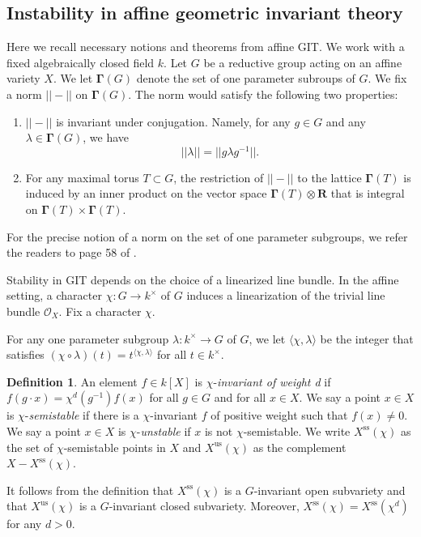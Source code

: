 \documentclass[a4paper]{amsart}
\numberwithin{equation}{section}
\theoremstyle{plain}
\theoremstyle{definition}
\newtheorem{definition}[theorem]{Definition}
\begin{document}
\subsection{Instability in affine geometric invariant theory}\label{affine_GIT}
Here we recall necessary notions and theorems from affine GIT. We work with a fixed algebraically closed field $k$. Let $G$ be a reductive group acting on an affine variety $X$. We let $\pmb{\Gamma}(G)$ denote the set of one parameter subroups of $G$. We fix a norm $||-||$ on $\pmb{\Gamma}(G)$. The norm would satisfy the following two properties:
\begin{enumerate}
    \item $||-||$ is invariant under conjugation. Namely, for any $g\in G$ and any $\lambda\in\pmb{\Gamma}(G)$, we have 
    $$||\lambda||=||g\lambda g^{-1}||.$$
    \item For any maximal torus $T\subset G$, the restriction of $||-||$ to the lattice $\pmb{\Gamma}(T)$ is induced by an inner product on the vector space $\pmb{\Gamma}(T)\otimes\mathbf{R}$ that is integral on $\pmb{\Gamma}(T)\times\pmb{\Gamma}(T)$.
\end{enumerate}
For the precise notion of a norm on the set of one parameter subgroups, we refer the readers to page 58 of \cite{MR1304906}. 

Stability in GIT depends on the choice of a linearized line bundle. In the affine setting, a character $\chi:G\rightarrow k^{\times}$ of $G$ induces a linearization of the trivial line bundle $\mathscr{O}_X$. Fix a character $\chi$.

For any one parameter subgroup $\lambda:k^{\times}\rightarrow G$ of $G$, we let $\langle\chi,\lambda\rangle$ be the integer that satisfies $(\chi\circ \lambda)(t)=t^{\langle\chi,\lambda\rangle}$ for all $t\in k^{\times}$. 
\begin{definition}\label{Stability_def}
An element $f\in k[X]$ is $\chi$-\emph{invariant of weight d} if $f(g\cdot x)=\chi^{d}(g^{-1})f(x)$ for all $g\in G$ and for all $x\in X$. We say a point $x\in X$
is $\chi$-\emph{semistable} if there is a $\chi$-invariant $f$ of positive
weight such that $f(x)\neq 0$. We say a point $x\in X$ is $\chi$-\emph{unstable} if $x$ is not $\chi$-semistable.
We write $X^{\text{ss}}(\chi)$ as the set of $\chi$-semistable points in $X$ and $X^{\text{us}}(\chi)$ as the complement $X-X^{\text{ss}}(\chi).$
\end{definition}

It follows from the definition that $X^{\text{ss}}(\chi)$ is a $G$-invariant open subvariety and that $X^{\text{us}}(\chi)$ is a $G$-invariant closed subvariety. Moreover, $X^{\text{ss}}(\chi)=X^{\text{ss}}(\chi^{d})$ for any $d>0$. 
\end{document}
